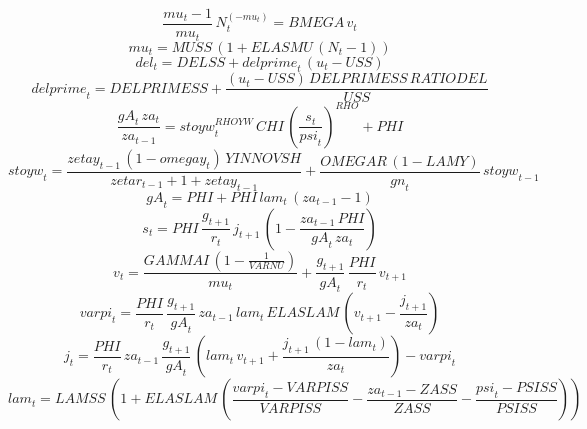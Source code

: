 \begin{dmath}
\frac{{mu}_{t}-1}{{mu}_{t}}\, {N}_{t}^{\left(-{mu}_{t}\right)}={BMEGA}\, {v}_{t}
\end{dmath}
\begin{dmath}
{mu}_{t}={MUSS}\, \left(1+{ELASMU}\, \left({N}_{t}-1\right)\right)
\end{dmath}
\begin{dmath}
{del}_{t}={DELSS}+{delprime}_{t}\, \left({u}_{t}-{USS}\right)
\end{dmath}
\begin{dmath}
{delprime}_{t}={DELPRIMESS}+\frac{\left({u}_{t}-{USS}\right)\, {DELPRIMESS}\, {RATIODEL}}{{USS}}
\end{dmath}
\begin{dmath}
\frac{{gA}_{t}\, {za}_{t}}{{za}_{t-1}}={stoyw}_{t}^{{RHOYW}}\, {CHI}\, \left(\frac{{s}_{t}}{{psi}_{t}}\right)^{{RHO}}+{PHI}
\end{dmath}
\begin{dmath}
{stoyw}_{t}=\frac{{zetay}_{t-1}\, \left(1-{omegay}_{t}\right)\, {YINNOVSH}}{{zetar}_{t-1}+1+{zetay}_{t-1}}+\frac{{OMEGAR}\, \left(1-{LAMY}\right)}{{gn}_{t}}\, {stoyw}_{t-1}
\end{dmath}
\begin{dmath}
{gA}_{t}={PHI}+{PHI}\, {lam}_{t}\, \left({za}_{t-1}-1\right)
\end{dmath}
\begin{dmath}
{s}_{t}={PHI}\, \frac{{g}_{t+1}}{{r}_{t}}\, {j}_{t+1}\, \left(1-\frac{{za}_{t-1}\, {PHI}}{{gA}_{t}\, {za}_{t}}\right)
\end{dmath}
\begin{dmath}
{v}_{t}=\frac{{GAMMAI}\, \left(1-\frac{1}{{VARNU}}\right)}{{mu}_{t}}+\frac{{g}_{t+1}}{{gA}_{t}}\, \frac{{PHI}}{{r}_{t}}\, {v}_{t+1}
\end{dmath}
\begin{dmath}
{varpi}_{t}=\frac{{PHI}}{{r}_{t}}\, \frac{{g}_{t+1}}{{gA}_{t}}\, {za}_{t-1}\, {lam}_{t}\, {ELASLAM}\, \left({v}_{t+1}-\frac{{j}_{t+1}}{{za}_{t}}\right)
\end{dmath}
\begin{dmath}
{j}_{t}=\frac{{PHI}}{{r}_{t}}\, {za}_{t-1}\, \frac{{g}_{t+1}}{{gA}_{t}}\, \left({lam}_{t}\, {v}_{t+1}+\frac{{j}_{t+1}\, \left(1-{lam}_{t}\right)}{{za}_{t}}\right)-{varpi}_{t}
\end{dmath}
\begin{dmath}
{lam}_{t}={LAMSS}\, \left(1+{ELASLAM}\, \left(\frac{{varpi}_{t}-{VARPISS}}{{VARPISS}}-\frac{{za}_{t-1}-{ZASS}}{{ZASS}}-\frac{{psi}_{t}-{PSISS}}{{PSISS}}\right)\right)
\end{dmath}
